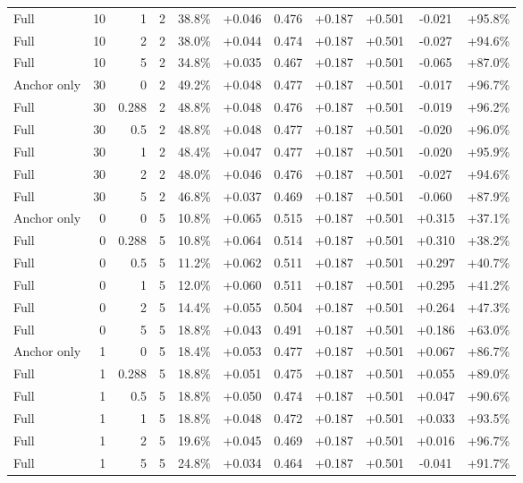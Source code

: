 \begin{table}[htbp]
\begin{tabular}{lrrrccccccc}
Full & 10 & 1 & 2 & 38.8\% & +0.046 & 0.476 & +0.187 & +0.501 & -0.021 & +95.8\% \\
Full & 10 & 2 & 2 & 38.0\% & +0.044 & 0.474 & +0.187 & +0.501 & -0.027 & +94.6\% \\
Full & 10 & 5 & 2 & 34.8\% & +0.035 & 0.467 & +0.187 & +0.501 & -0.065 & +87.0\% \\
Anchor only & 30 & 0 & 2 & 49.2\% & +0.048 & 0.477 & +0.187 & +0.501 & -0.017 & +96.7\% \\
Full & 30 & 0.288 & 2 & 48.8\% & +0.048 & 0.476 & +0.187 & +0.501 & -0.019 & +96.2\% \\
Full & 30 & 0.5 & 2 & 48.8\% & +0.048 & 0.477 & +0.187 & +0.501 & -0.020 & +96.0\% \\
Full & 30 & 1 & 2 & 48.4\% & +0.047 & 0.477 & +0.187 & +0.501 & -0.020 & +95.9\% \\
Full & 30 & 2 & 2 & 48.0\% & +0.046 & 0.476 & +0.187 & +0.501 & -0.027 & +94.6\% \\
Full & 30 & 5 & 2 & 46.8\% & +0.037 & 0.469 & +0.187 & +0.501 & -0.060 & +87.9\% \\
Anchor only & 0 & 0 & 5 & 10.8\% & +0.065 & 0.515 & +0.187 & +0.501 & +0.315 & +37.1\% \\
Full & 0 & 0.288 & 5 & 10.8\% & +0.064 & 0.514 & +0.187 & +0.501 & +0.310 & +38.2\% \\
Full & 0 & 0.5 & 5 & 11.2\% & +0.062 & 0.511 & +0.187 & +0.501 & +0.297 & +40.7\% \\
Full & 0 & 1 & 5 & 12.0\% & +0.060 & 0.511 & +0.187 & +0.501 & +0.295 & +41.2\% \\
Full & 0 & 2 & 5 & 14.4\% & +0.055 & 0.504 & +0.187 & +0.501 & +0.264 & +47.3\% \\
Full & 0 & 5 & 5 & 18.8\% & +0.043 & 0.491 & +0.187 & +0.501 & +0.186 & +63.0\% \\
Anchor only & 1 & 0 & 5 & 18.4\% & +0.053 & 0.477 & +0.187 & +0.501 & +0.067 & +86.7\% \\
Full & 1 & 0.288 & 5 & 18.8\% & +0.051 & 0.475 & +0.187 & +0.501 & +0.055 & +89.0\% \\
Full & 1 & 0.5 & 5 & 18.8\% & +0.050 & 0.474 & +0.187 & +0.501 & +0.047 & +90.6\% \\
Full & 1 & 1 & 5 & 18.8\% & +0.048 & 0.472 & +0.187 & +0.501 & +0.033 & +93.5\% \\
Full & 1 & 2 & 5 & 19.6\% & +0.045 & 0.469 & +0.187 & +0.501 & +0.016 & +96.7\% \\
Full & 1 & 5 & 5 & 24.8\% & +0.034 & 0.464 & +0.187 & +0.501 & -0.041 & +91.7\% \\

\end{tabular}
\end{table}
